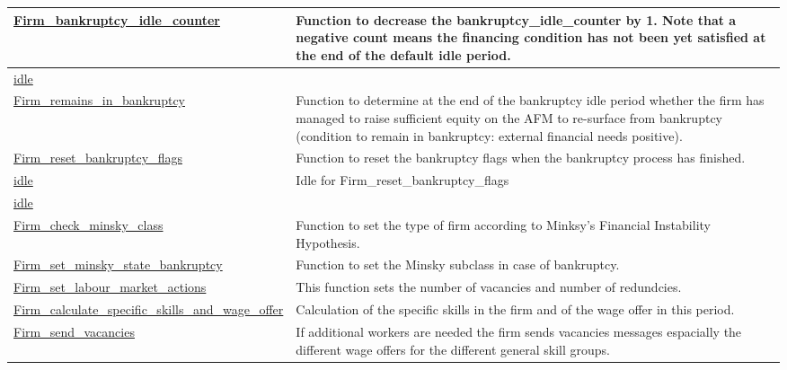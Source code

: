 \documentclass[a4paper,11pt]{article}
\begin{document}
\begin{longtable}[H!]{ll}
\midrule
\parbox{5cm}{\url{Firm_bankruptcy_idle_counter}}  & \parbox{10cm}{Function to decrease the bankruptcy\_idle\_counter by 1. 
Note that a negative count means the financing condition has not been yet satisfied at the end of the default idle period.} \\
\midrule
\parbox{5cm}{\url{idle}}  & \parbox{10cm}{} \\
\midrule
\parbox{5cm}{\url{Firm_remains_in_bankruptcy}}  & \parbox{10cm}{Function to determine at the end of the bankruptcy idle period whether the firm has managed to raise sufficient equity on the AFM to re-surface from bankruptcy (condition to remain in bankruptcy: external financial needs positive).} \\
\midrule
\parbox{5cm}{\url{Firm_reset_bankruptcy_flags}}  & \parbox{10cm}{Function to reset the bankruptcy flags when the bankruptcy process has finished.} \\
\midrule
\parbox{5cm}{\url{idle}}  & \parbox{10cm}{Idle for Firm\_reset\_bankruptcy\_flags} \\
\midrule
\parbox{5cm}{\url{idle}}  & \parbox{10cm}{} \\
\midrule
\parbox{5cm}{\url{Firm_check_minsky_class}}  & \parbox{10cm}{Function to set the type of firm according to Minksy's Financial Instability Hypothesis.} \\
\midrule
\parbox{5cm}{\url{Firm_set_minsky_state_bankruptcy}}  & \parbox{10cm}{Function to set the Minsky subclass in case of bankruptcy.} \\
\midrule
\parbox{5cm}{\url{Firm_set_labour_market_actions}}  & \parbox{10cm}{This function sets the number of vacancies and number of redundcies.} \\
\midrule
\parbox{5cm}{\url{Firm_calculate_specific_skills_and_wage_offer}}  & \parbox{10cm}{Calculation of the specific skills in the firm and of the wage offer in this period.} \\
\midrule
\parbox{5cm}{\url{Firm_send_vacancies}}  & \parbox{10cm}{If additional workers are needed the firm sends vacancies messages espacially the different wage offers for the different general skill groups.} \\

\end{longtable}
\end{document}
